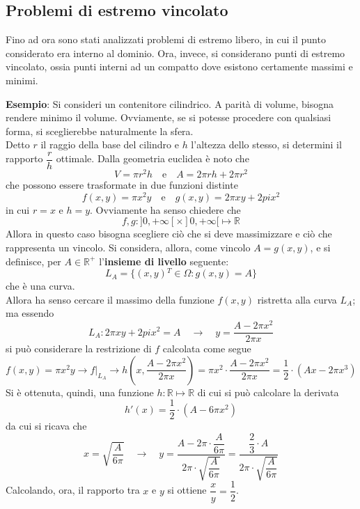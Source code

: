 \documentclass[a4paper]{extarticle}
\begin{document}
\vspace{1em}
\noindent
\subsection{Problemi di estremo vincolato}
Fino ad ora sono stati analizzati problemi di estremo libero, in cui il punto considerato era interno al dominio. Ora, invece, si considerano punti di estremo vincolato, ossia punti interni ad un compatto dove esistono certamente massimi e minimi.

\vspace{1em}
\noindent
\textbf{Esempio}: Si consideri un contenitore cilindrico. A parità di volume, bisogna rendere minimo il volume. Ovviamente, se si potesse procedere con qualsiasi forma, si sceglierebbe naturalmente la sfera.\\
Detto $r$ il raggio della base del cilindro e $h$ l'altezza dello stesso, si determini il rapporto $\dfrac{r}{h}$ ottimale. Dalla geometria euclidea è noto che
\[V = \pi r^2 h \hspace{1em} \text{e} \hspace{1em} A = 2\pi r h + 2\pi r^2\]
che possono essere trasformate in due funzioni distinte
\[f(x,y) = \pi x^2 y \hspace{1em} \text{e} \hspace{1em} g(x,y) = 2\pi xy + 2pi x^2\]
in cui $r=x$ e $h=y$. Ovviamente ha senso chiedere che
\[f,g : ]0,+\infty[ \times ]0,+\infty[ \longmapsto \mathbb{R}\]
Allora in questo caso bisogna scegliere ciò che si deve massimizzare e ciò che rappresenta un vincolo. Si considera, allora, come vincolo $A=g(x,y)$, e si definisce, per $A \in \mathbb{R}^{+}$ l'\textbf{insieme di livello} seguente:
\[L_A = \{(x,y){^T} \in \Omega : g(x,y) = A\}\]
che è una curva.\\
Allora ha senso cercare il massimo della funzione $f(x,y)$ ristretta alla curva $L_A$; ma essendo
\[L_A : 2\pi xy + 2pi x^2 = A \hspace{1em} \rightarrow \hspace{1em} y = \dfrac{A - 2\pi x^2}{2 \pi x}\]
si può considerare la restrizione di $f$ calcolata come segue
\[f(x,y) = \pi x^2 y \rightarrow f \vert_{L_A} \rightarrow h \left(x,\dfrac{A-2 \pi x^2}{2 \pi x} \right) = \pi x^2 \cdot \dfrac{A - 2\pi x^2}{2\pi x} = \dfrac{1}{2} \cdot \left(A x - 2 \pi x^3\right)\]
Si è ottenuta, quindi, una funzione $h : \mathbb{R} \longmapsto \mathbb{R}$ di cui si può calcolare la derivata
\[h'(x) = \dfrac{1}{2} \cdot (A - 6\pi x^2)\]
da cui si ricava che
\[x = \sqrt{\dfrac{A}{6 \pi}} \hspace{1em} \rightarrow \hspace{1em} y = \dfrac{A - 2\pi \cdot \dfrac{A}{6 \pi}}{2 \pi \cdot \sqrt{\dfrac{A}{6 \pi}}} = \dfrac{\dfrac{2}{3} \cdot A}{2\pi \cdot \sqrt{\dfrac{A}{6 \pi}}}\]
Calcolando, ora, il rapporto tra $x$ e $y$ si ottiene $\displaystyle{\dfrac{x}{y} = \dfrac{1}{2}}$.
\end{document}
